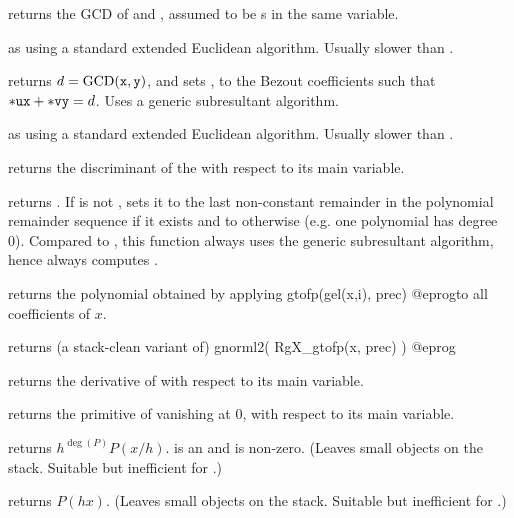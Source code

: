 
 returns the GCD of  and ,
assumed to be s in the same variable.

 as  using a standard
extended Euclidean algorithm. Usually slower than .

 returns
$d = {\rm GCD}({\tt x},{\tt y})$, and sets ,  to the Bezout
coefficients such that ${\tt *ux} + {\tt *vy} = d$. Uses a generic
subresultant algorithm.

 as
 using a standard extended Euclidean algorithm. Usually
slower than .

 returns the discriminant of the  
with respect to its main variable.

 returns
. If  is not , sets it to the last
non-constant remainder in the polynomial remainder sequence if it exists and to
 otherwise (e.g. one polynomial has degree 0). Compared to
, this function always uses the generic subresultant
algorithm, hence always computes .


 returns the polynomial obtained by
applying
\bprog
  gtofp(gel(x,i), prec)
@eprog\noindent to all coefficients of $x$.

 returns (a stack-clean variant of)
\bprog
  gnorml2( RgX_gtofp(x, prec) )
@eprog

 returns the derivative of  with respect to
its main variable.

 returns the primitive of  vanishing at
$0$, with respect to its main variable.

 returns $h^{\deg(P)} P(x/h)$.
 is an  and  is non-zero. (Leaves small objects on the
stack. Suitable but inefficient for .)

 returns $P(h x)$. (Leaves small objects
on the stack. Suitable but inefficient for .)

